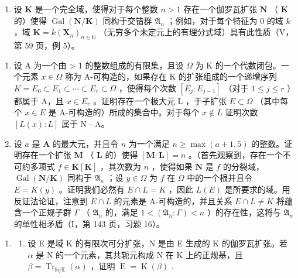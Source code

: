 \begin{enumerate}
\def\labelenumi{\arabic{enumi})}
\setcounter{enumi}{9}
\tightlist
\item
  设 \(\mathbf{K}\) 是一个完全域，使得对于每个整数 \(n > 1\) 存在一个伽罗瓦扩张 \(\mathbf{N}\) （ \(\mathbf{K}\) 的）使得 \(\operatorname{Gal}(\mathbf{N} / \mathbf{K})\) 同构于交错群 \(\mathfrak{A}_n\) ；例如，对于每个特征为 0 的域 \(k\) ，域 \(\mathbf{K} = k(\mathbf{X}_n)_{n \in \mathbb{N}}\) （无穷多个未定元上的有理分式域）具有此性质（V，第 59 页，例 5）。
\end{enumerate}

\begin{enumerate}
\def\labelenumi{\alph{enumi})}
\item
  设 A 为一个由 \textgreater{} 1 的整数组成的有限集，且设 \(\Omega\) 为 K 的一个代数闭包。一个元素 \(x \in \Omega\) 称为 A-可构造的，如果存在 K 的扩张组成的一个递增序列 \(K = E_{0} \subset E_{1} \subset \cdots \subset E_{r} \subset \Omega\) ，使得每个次数 \([E_{j}: E_{j-1}]\) （对于 \(1 \leqslant j \leqslant r\) ）都属于 A，且 \(x \in E_{r}\) 。证明存在一个极大元 L ，于子扩张 \(E \subset \Omega\) （其中每个 \(x \in E\) 是 A-可构造的）所成的集合中。对于每个 \(x \notin L\) 证明次数 \([L(x): L]\) 属于 N - A。
\item
  设 \(a\) 是 \(\mathbf{A}\) 的最大元，并且令 \(n\) 为一个满足 \(n \geqslant \max (a + 1,5)\) 的整数。证明存在一个扩张 \(\mathbf{M}\) （ \(\mathbf{L}\) 的）使得 \([\mathbf{M}:\mathbf{L}] = n\) 。（首先观察到，存在一个不可约多项式 \(f \in \mathbf{K}[\mathbf{K}]\) ，其次数为 \(n\) ，使得如果 \(\mathbf{N}\) 是 \(f\) 的分裂域， \(\operatorname{Gal}(\mathbf{N} / \mathbf{K})\) 同构于 \(\mathfrak{A}_n\) ；设 \(y \in \Omega\) 为 \(f\) 在 \(\Omega\) 中的一个根并且令 \(E = K(y)\) 。证明我们必然有 \(E \cap L = K\) ，因此 \(L(E)\) 是所要求的域。用反证法论证，注意到 \(E \cap L\) 的元素是 A-可构造的，并且关系 \(E \cap L \neq K\) 将蕴含一个正规子群 \(\Gamma\) （ \(\mathfrak{A}_n\) 的，满足 \(1 < (\mathfrak{A}_n:\Gamma) < n\) ）的存在性，这将与 \(\mathfrak{A}_n\) 的单性相矛盾（I，第 143 页，习题 16）。
\end{enumerate}

\begin{enumerate}
\def\labelenumi{\arabic{enumi})}
\setcounter{enumi}{10}
\tightlist
\item
  \begin{enumerate}
  \def\labelenumii{\alph{enumii})}
  \tightlist
  \item
    设 E 是域 K 的有限次可分扩张，N 是由 E 生成的 K 的伽罗瓦扩张。若 \(\alpha\) 是 N 的一个元素，其共轭元构成 N 在 K 上的正规基，且 \(\beta = \operatorname{Tr}_{\mathbb{N}/\mathbb{E}}(\alpha)\) ，证明 \(\operatorname{E} = \operatorname{K}(\beta)\) .
  \end{enumerate}
\end{enumerate}

